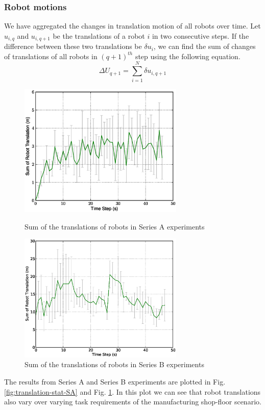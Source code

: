 \documentclass[smallcondensed]{svjour3}
\begin{document}
\subsubsection{Robot motions}
We have aggregated the changes in translation motion of all robots over time. Let $u_{i,q}$ and $u_{i,q+1}$ be the translations of a robot $i$ in two consecutive steps. If the difference between these two translations be $\delta u_{i}$, we can find the sum of changes of translations of all robots in $(q+1)^{th}$ step using the following equation.
\begin{equation}
\Delta U_{q+1} = \sum_{i=1}^{N} \delta u_{i, q+1} 
\label{eqn:Delta-Tr}
\end{equation}
\begin{figure}
\centering
\includegraphics[width=0.7\textwidth]{images/global-8robots/8robots-DeltaTranslationStat.eps}
\caption{\small Sum of the translations of robots in Series A experiments}
\label{fig:translation-stat-SA} %
\centering
\includegraphics[width=0.7\textwidth]{images/global/DeltaTranslationStat.eps}
\caption{\small Sum of the translations of robots in Series B experiments}
\label{fig:translation-stat-SB} %
\end{figure}
The results from Series A and Series B experiments are plotted in Fig. \ref{fig:translation-stat-SA} and Fig. \ref{fig:translation-stat-SB}. In this plot we can see that robot translations also vary over varying task requirements of the manufacturing shop-floor scenario.
\end{document}
